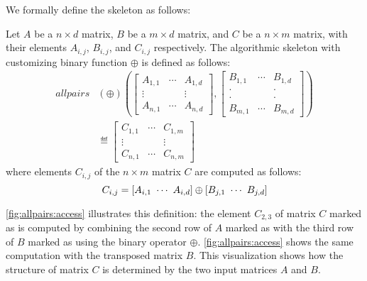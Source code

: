 We formally define the \allpairs skeleton as follows:

\begin{definition}
  \label{def:allpairs}
  Let $A$ be a $n\times d$ matrix, $B$ be a $m\times d$ matrix, and $C$ be a $n\times m$ matrix, with their elements $A_{i,j}$, $B_{i,j}$, and $C_{i,j}$ respectively.
  The algorithmic skeleton \allpairs with customizing binary function $\oplus$ is defined as follows:
  \begin{equation*}
    \begin{split}
    allpairs&(\oplus)\left(%
      \left[ \begin{array}{ccc} A_{1,1} & \cdots & A_{1,d}\\[.25em] \vdots & & \vdots\\[.25em] A_{n,1} & \cdots & A_{n,d} \end{array}\right], %
      \left[ \begin{array}{ccc} B_{1,1} & \cdots & B_{1,d}\\[-.25em] \cdot & & \cdot\\[-.75em] \cdot & & \cdot\\[-.25em] B_{m,1} & \cdots & B_{m,d} \end{array}\right]%
      \right)\\
    &\eqdef \left[ \begin{array}{ccc} C_{1,1} & \cdots & C_{1,m}\\[.25em] \vdots & & \vdots\\[.25em] C_{n,1} & \cdots & C_{n,m} \end{array} \right]
    \end{split}
  \end{equation*}
  where elements $C_{i,j}$ of the $n\times m$ matrix $C$ are computed as follows:
  \[
    C_{i,j} = \left[A_{i,1}\ \cdots\ A_{i,d}\right] \oplus \left[B_{j,1}\ \cdots\ B_{j,d}\right]
  \]
\end{definition}

\autoref{fig:allpairs:access} illustrates this definition:
the element $C_{2,3}$ of matrix $C$ marked as  is computed by combining the second row of $A$ marked as  with the third row of $B$ marked as  using the binary operator $\oplus$.
\autoref{fig:allpairs:access} shows the same computation with the transposed matrix $B$.
This visualization shows how the structure of matrix $C$ is determined by the two input matrices $A$ and $B$.

